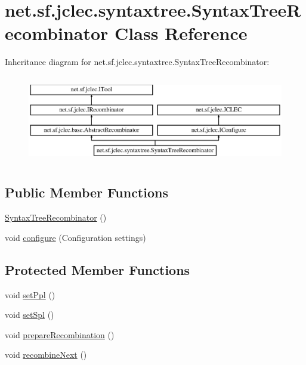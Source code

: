 \hypertarget{classnet_1_1sf_1_1jclec_1_1syntaxtree_1_1_syntax_tree_recombinator}{\section{net.\-sf.\-jclec.\-syntaxtree.\-Syntax\-Tree\-Recombinator Class Reference}
\label{classnet_1_1sf_1_1jclec_1_1syntaxtree_1_1_syntax_tree_recombinator}
}
Inheritance diagram for net.\-sf.\-jclec.\-syntaxtree.\-Syntax\-Tree\-Recombinator\-:\begin{figure}[H]
\begin{center}
\leavevmode
\includegraphics[height=3.875432cm]{classnet_1_1sf_1_1jclec_1_1syntaxtree_1_1_syntax_tree_recombinator}
\end{center}
\end{figure}
\subsection*{Public Member Functions}
\begin{DoxyCompactItemize}
\item 
\hyperlink{classnet_1_1sf_1_1jclec_1_1syntaxtree_1_1_syntax_tree_recombinator_a0e7e8f47d6a093d8774e78126bfccc76}{Syntax\-Tree\-Recombinator} ()
\item 
void \hyperlink{classnet_1_1sf_1_1jclec_1_1syntaxtree_1_1_syntax_tree_recombinator_ae22c9aaac84dedda6a2e510091bbe234}{configure} (Configuration settings)
\end{DoxyCompactItemize}
\subsection*{Protected Member Functions}
\begin{DoxyCompactItemize}
\item 
void \hyperlink{classnet_1_1sf_1_1jclec_1_1syntaxtree_1_1_syntax_tree_recombinator_aaa13f75a8e4aeb90b5e0637c6ed76d1d}{set\-Ppl} ()
\item 
void \hyperlink{classnet_1_1sf_1_1jclec_1_1syntaxtree_1_1_syntax_tree_recombinator_a3032778d07527a97a5cb656b7b736efe}{set\-Spl} ()
\item 
void \hyperlink{classnet_1_1sf_1_1jclec_1_1syntaxtree_1_1_syntax_tree_recombinator_acdf452d49c571862c1b660f15b62d9bd}{prepare\-Recombination} ()
\item 
void \hyperlink{classnet_1_1sf_1_1jclec_1_1syntaxtree_1_1_syntax_tree_recombinator_ae0f7eb381147988518b111754644aa00}{recombine\-Next} ()
\end{DoxyCompactItemize}
